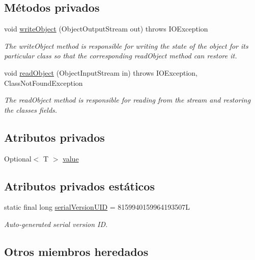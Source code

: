 \subsection*{Métodos privados}
\begin{DoxyCompactItemize}
\item 
void \mbox{\hyperlink{a00180_aeb8db23c0310aa0fd0d9bcb2da10fa74}{write\+Object}} (Object\+Output\+Stream out)  throws I\+O\+Exception 
\begin{DoxyCompactList}\small\item\em The write\+Object method is responsible for writing the state of the object for its particular class so that the corresponding read\+Object method can restore it. \end{DoxyCompactList}\item 
void \mbox{\hyperlink{a00180_a51ae17b2577c4ffc87ccf4abca82ab3d}{read\+Object}} (Object\+Input\+Stream in)  throws I\+O\+Exception, Class\+Not\+Found\+Exception 
\begin{DoxyCompactList}\small\item\em The read\+Object method is responsible for reading from the stream and restoring the classes fields. \end{DoxyCompactList}\end{DoxyCompactItemize}
\subsection*{Atributos privados}
\begin{DoxyCompactItemize}
\item 
Optional$<$ T $>$ \mbox{\hyperlink{a00180_a7f337dfd21158b7642243b5fd1fcb877}{value}}
\end{DoxyCompactItemize}
\subsection*{Atributos privados estáticos}
\begin{DoxyCompactItemize}
\item 
static final long \mbox{\hyperlink{a00180_a01052aac89cda6c5f230343d40b54e89}{serial\+Version\+U\+ID}} = 8159940159964193507L
\begin{DoxyCompactList}\small\item\em Auto-\/generated serial version ID. \end{DoxyCompactList}\end{DoxyCompactItemize}
\subsection*{Otros miembros heredados}


